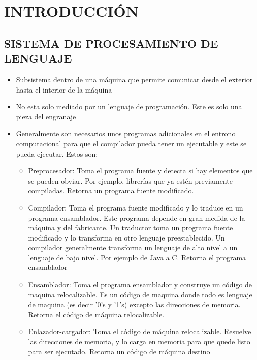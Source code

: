 \chapter{INTRODUCCIÓN}



\section{SISTEMA DE PROCESAMIENTO DE LENGUAJE}
\begin{itemize}
    \item Subsistema dentro de una máquina que permite comunicar desde el exterior hasta el interior de la máquina
    \item No esta solo mediado por un lenguaje de programación. Este es solo una pieza del engranaje
    \item Generalmente son necesarios unos programas adicionales en el entrono computacional para que el compilador pueda tener un ejecutable y este se pueda ejecutar. Estos son:
    \begin{itemize}
        \item Preprocesador: Toma el programa fuente y detecta si hay elementos que se pueden obviar. Por ejemplo, librerías que ya estén previamente compiladas. Retorna un programa fuente modificado.
        \item Compilador: Toma el programa fuente modificado y lo traduce en un programa ensamblador. Este programa depende en gran medida de la máquina y del fabricante. Un traductor toma un programa fuente modificado y lo transforma en otro lenguaje preestablecido. Un compilador generalmente transforma un lenguaje de alto nivel a un lenguaje de bajo nivel. Por ejemplo de Java a C. Retorna el programa ensamblador
        \item Ensamblador: Toma el programa ensamblador y construye un código de maquina relocalizable. Es un código de maquina donde todo es lenguaje de maquina (es decir '0's y '1's) excepto las direcciones de memoria. Retorna el código de máquina relocalizable.
        \item Enlazador-cargador: Toma el código de máquina relocalizable. Resuelve las direcciones de memoria, y lo carga en memoria para que quede listo para ser ejecutado. Retorna un código de máquina destino
    \end{itemize}
    
   
\end{itemize}



